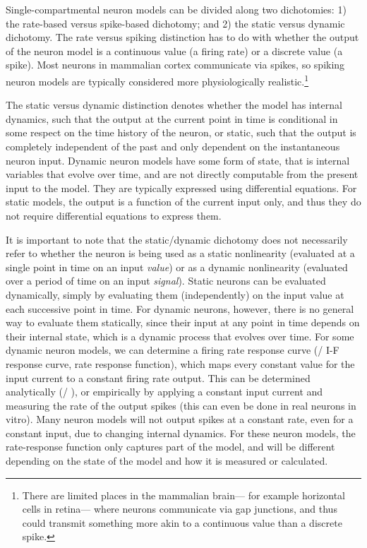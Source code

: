 Single-compartmental neuron models can be divided along two dichotomies:
1) the rate-based versus spike-based dichotomy;
and 2) the static versus dynamic dichotomy. %
The rate versus spiking distinction has to do with whether
the output of the neuron model is a continuous value (a firing rate)
or a discrete value (a spike).
Most neurons in mammalian cortex communicate via spikes,
so spiking neuron models are typically considered more physiologically realistic.\footnote{
  There are limited places in the mammalian brain---%
  for example horizontal cells in retina---%
  where neurons communicate via gap junctions,
  and thus could transmit something more akin to a continuous value
  than a discrete spike.}

The static versus dynamic distinction denotes whether the model has
internal dynamics,
such that the output at the current point in time is conditional in some
respect on the time history of the neuron,
or static, such that the output is completely independent of the past
and only dependent on the instantaneous neuron input.
Dynamic neuron models have some form of state,
that is internal variables that evolve over time,
and are not directly computable from the present input to the model.
They are typically expressed using differential equations.
For static models, the output is a function of the current input only,
and thus they do not require differential equations to express them.

It is important to note that the static/dynamic dichotomy does not necessarily
refer to whether the neuron is being used as a static nonlinearity
(evaluated at a single point in time on an input \emph{value})
or as a dynamic nonlinearity (evaluated over a period of time on an input \emph{signal}).
Static neurons can be evaluated dynamically,
simply by evaluating them (independently) on the input value at each successive point in time.
For dynamic neurons, however, there is no general way to evaluate them statically,
since their input at any point in time depends on their internal state,
which is a dynamic process that evolves over time.
For some dynamic neuron models,
we can determine a firing rate response curve
(\aka/ I-F response curve, rate response function),
which maps every constant value for the input current
to a constant firing rate output.
This can be determined analytically (\eg/ ),
or empirically by applying a constant input current
and measuring the rate of the output spikes
(this can even be done in real neurons in vitro).
Many neuron models will not output spikes at a constant rate,
even for a constant input,
due to changing internal dynamics.
For these neuron models,
the rate-response function only captures part of the model,
and will be different depending on the state of the model
and how it is measured or calculated.


